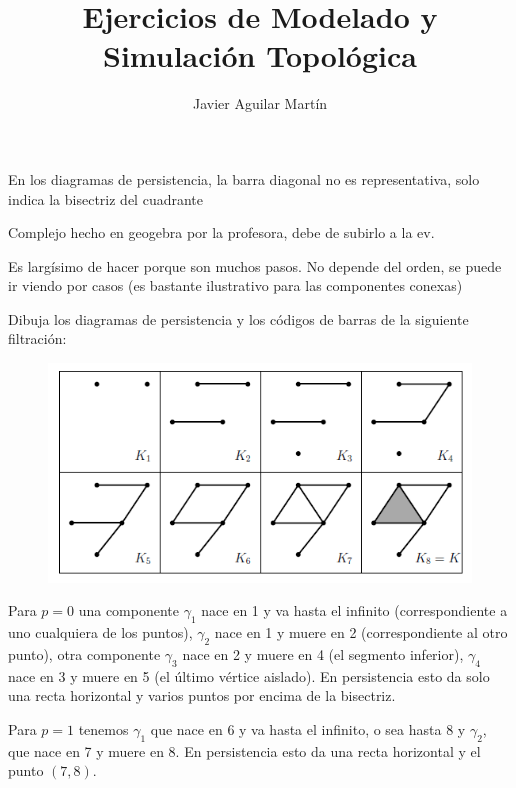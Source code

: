 \documentclass[twoside]{article}
\begin{document}
\title{Ejercicios de Modelado y Simulación Topológica}
\author{Javier Aguilar Martín}
\maketitle
En los diagramas de persistencia, la barra diagonal no es representativa, solo indica la bisectriz del cuadrante
\begin{ejercicio}{4}
\end{ejercicio}
\begin{solucion}
Complejo hecho en geogebra por la profesora, debe de subirlo a la ev. 
\end{solucion}
\newpage

\begin{ejercicio}{5}
\end{ejercicio}
\begin{solucion}
Es largísimo de hacer porque son muchos pasos. No depende del orden, se puede ir viendo por casos (es bastante ilustrativo para las componentes conexas)
\end{solucion}

\newpage

\begin{ejercicio}{6}
Dibuja los diagramas de persistencia y los códigos de barras de la siguiente filtración:
\begin{figure}[h!]
\centering
\includegraphics[scale=0.8]{1-6}
\end{figure}
\end{ejercicio}
\begin{solucion}
Para $p=0$ una componente $\gamma_1$ nace en 1 y va hasta el infinito (correspondiente a uno cualquiera de los puntos), $\gamma_2$ nace en 1 y muere en 2 (correspondiente al otro punto), otra componente $\gamma_3$ nace en 2 y muere en 4 (el segmento inferior), $\gamma_4$ nace en 3 y muere en 5 (el último vértice aislado). En persistencia esto da solo una recta horizontal y varios puntos por encima de la bisectriz.

Para $p=1$ tenemos $\gamma_1$ que nace en 6 y va hasta el infinito, o sea hasta 8 y $\gamma_2$, que nace en 7 y muere en 8. En persistencia esto da una recta horizontal y el punto $(7,8)$. 
\end{solucion}
\end{document}
